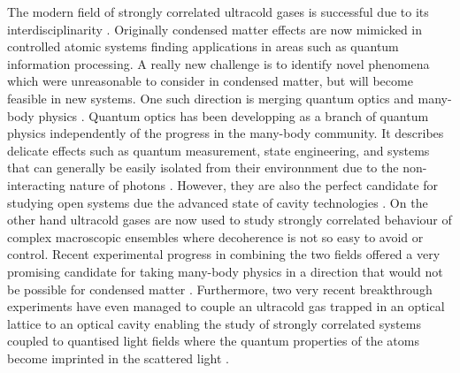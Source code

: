 The modern field of strongly correlated ultracold gases is successful
due to its interdisciplinarity \cite{lewenstein2007,
  bloch2008}. Originally condensed matter effects are now mimicked in
controlled atomic systems finding applications in areas such as
quantum information processing. A really new challenge is to identify
novel phenomena which were unreasonable to consider in condensed
matter, but will become feasible in new systems. One such direction is
merging quantum optics and many-body physics \cite{mekhov2012,
  ritsch2013}. Quantum optics has been developping as a branch of
quantum physics independently of the progress in the many-body
community. It describes delicate effects such as quantum measurement,
state engineering, and systems that can generally be easily isolated
from their environnment due to the non-interacting nature of photons
\cite{Scully}. However, they are also the perfect candidate for
studying open systems due the advanced state of cavity technologies
\cite{carmichael, MeasurementControl}. On the other hand ultracold
gases are now used to study strongly correlated behaviour of complex
macroscopic ensembles where decoherence is not so easy to avoid or
control. Recent experimental progress in combining the two fields
offered a very promising candidate for taking many-body physics in a
direction that would not be possible for condensed matter
\cite{baumann2010, wolke2012, schmidt2014}. Furthermore, two very
recent breakthrough experiments have even managed to couple an
ultracold gas trapped in an optical lattice to an optical cavity
enabling the study of strongly correlated systems coupled to quantised
light fields where the quantum properties of the atoms become
imprinted in the scattered light \cite{klinder2015, landig2016}.

